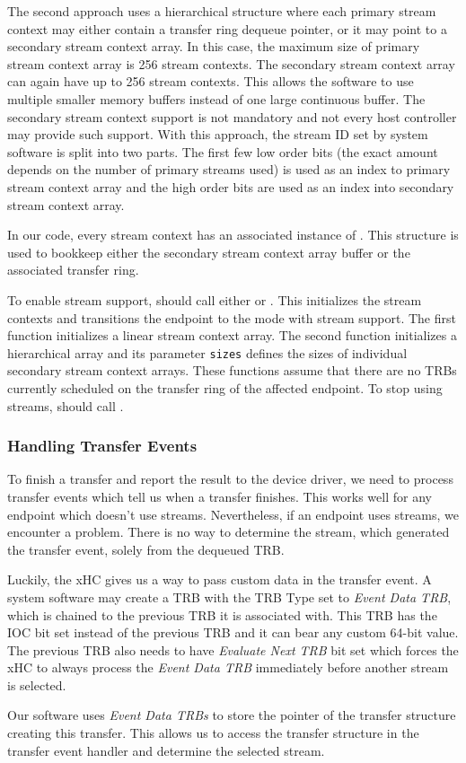 The second approach uses a hierarchical structure where each primary stream
context may either contain a transfer ring dequeue pointer, or it may point to
a secondary stream context array. In this case, the maximum size of primary
stream context array is 256 stream contexts. The secondary stream context array
can again have up to 256 stream contexts. This allows the software to use
multiple smaller memory buffers instead of one large continuous buffer. The
secondary stream context support is not mandatory and not every host controller
may provide such support. With this approach, the stream ID set by system
software is split into two parts. The first few low order bits (the exact
amount depends on the number of primary streams used) is used as an index to
primary stream context array and the high order bits are used as an index into
secondary stream context array.

In our code, every stream context has an associated instance of
. This structure is used to bookkeep either the
secondary stream context array buffer or the associated transfer ring.

To enable stream support,  should call either
 or
. This initializes the stream
contexts and transitions the endpoint to the mode with stream support. The
first function initializes a linear stream context array. The second function
initializes a hierarchical array and its parameter \texttt{sizes} defines the
sizes of individual secondary stream context arrays. These functions assume
that there are no TRBs currently scheduled on the transfer ring of the affected
endpoint. To stop using streams,  should call
.

\subsubsection{Handling Transfer Events}

To finish a transfer and report the result to the device driver, we need to
process transfer events which tell us when a transfer finishes. This works well
for any endpoint which doesn't use streams. Nevertheless, if an endpoint uses
streams, we encounter a problem. There is no way to determine the stream, which
generated the transfer event, solely from the dequeued TRB.

Luckily, the xHC gives us a way to pass custom data in the transfer event.
A system software may create a TRB with the TRB Type set to
\textit{Event Data TRB}, which is chained to the previous TRB it is associated
with. This TRB has the IOC bit set instead of the previous TRB and it can bear
any custom 64-bit value. The previous TRB also needs to have
\textit{Evaluate Next TRB} bit set which forces the xHC to always process the
\textit{Event Data TRB} immediately before another stream is selected.

Our software uses \textit{Event Data TRBs} to store the pointer of the transfer
structure creating this transfer. This allows us to access the transfer
structure in the transfer event handler and determine the selected stream.
